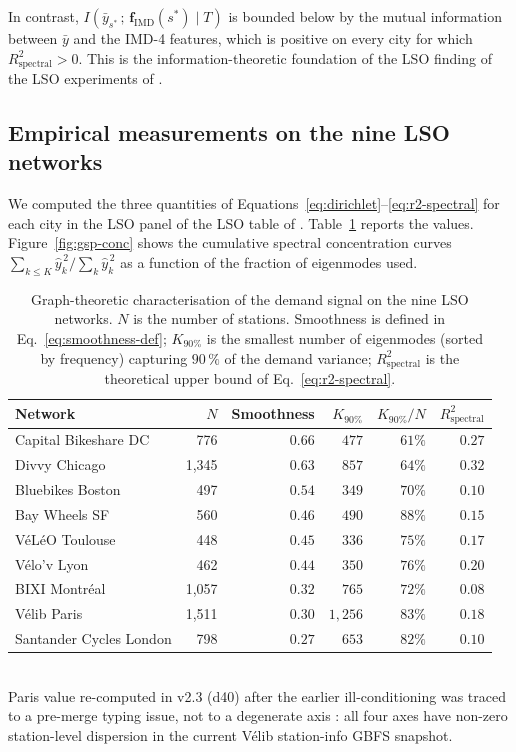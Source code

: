 In contrast, $I(\bar{y}_{s^*}\,;\, \mathbf{f}_{\mathrm{IMD}}(s^*) \mid T)$
is bounded below by the mutual information between $\bar{y}$ and
the IMD-4 features, which is positive on every city for which
$R^2_{\mathrm{spectral}} > 0$.  This is the
information-theoretic foundation of the LSO finding of
the LSO experiments of \citet{Fosse2026imd_national}.

\subsection{Empirical measurements on the nine LSO networks}

We computed the three quantities of
Equations~\eqref{eq:dirichlet}--\eqref{eq:r2-spectral} for each
city in the LSO panel of the LSO table of \citet{Fosse2026imd_national}.
Table~\ref{tab:gsp} reports the values.  Figure~\ref{fig:gsp-conc}
shows the cumulative spectral concentration curves
$\sum_{k \leq K} \hat{y}_k^{\,2} / \sum_k \hat{y}_k^{\,2}$ as a
function of the fraction of eigenmodes used.

\begin{table}[H]
\centering
\caption{Graph-theoretic characterisation of the demand signal on the nine
LSO networks.  $N$ is the number of stations.  Smoothness is defined in
Eq.~\eqref{eq:smoothness-def}; $K_{90\%}$ is the smallest number of
eigenmodes (sorted by frequency) capturing $90\,\%$ of the demand
variance; $R^2_{\mathrm{spectral}}$ is the theoretical upper bound of
Eq.~\eqref{eq:r2-spectral}.}
\label{tab:gsp}
\small
\begin{tabular}{@{}lrrrrr@{}}
\toprule
Network & $N$ & Smoothness & $K_{90\%}$ & $K_{90\%}/N$ & $R^2_{\mathrm{spectral}}$ \\
\midrule
Capital Bikeshare DC       &   776 & $0.66$ & $477$  & $61\%$ & $0.27$ \\
Divvy Chicago              & 1{,}345 & $0.63$ & $857$  & $64\%$ & $0.32$ \\
Bluebikes Boston           &   497 & $0.54$ & $349$  & $70\%$ & $0.10$ \\
Bay Wheels SF             &   560 & $0.46$ & $490$  & $88\%$ & $0.15$ \\
V\'eL\'eO Toulouse        &   448 & $0.45$ & $336$  & $75\%$ & $0.17$ \\
V\'elo'v Lyon              &   462 & $0.44$ & $350$  & $76\%$ & $0.20$ \\
BIXI Montr\'eal            & 1{,}057 & $0.32$ & $765$  & $72\%$ & $0.08$ \\
V\'elib Paris              & 1{,}511 & $0.30$ & $1{,}256$ & $83\%$ & $0.18$ \\
Santander Cycles London   &   798 & $0.27$ & $653$  & $82\%$ & $0.10$ \\
\bottomrule
\end{tabular}
\smallskip\\
{\footnotesize Paris value re-computed in v2.3 (d40) after the
earlier ill-conditioning was traced to a pre-merge typing issue,
not to a degenerate axis : all four axes have non-zero
station-level dispersion in the current V\'elib station-info GBFS
snapshot.}
\end{table}

